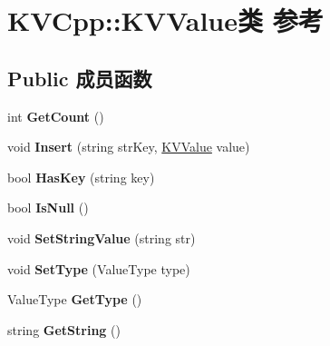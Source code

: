\hypertarget{class_k_v_cpp_1_1_k_v_value}{}\section{K\+V\+Cpp\+:\+:K\+V\+Value类 参考}
\label{class_k_v_cpp_1_1_k_v_value}
\subsection*{Public 成员函数}
\begin{DoxyCompactItemize}
\item 
\hypertarget{class_k_v_cpp_1_1_k_v_value_a1094ae0e25797cba3dcf28e4b39009a4}{}int {\bfseries Get\+Count} ()\label{class_k_v_cpp_1_1_k_v_value_a1094ae0e25797cba3dcf28e4b39009a4}

\item 
\hypertarget{class_k_v_cpp_1_1_k_v_value_a7e513ef26bca660c42dc024794b43326}{}void {\bfseries Insert} (string str\+Key, \hyperlink{class_k_v_cpp_1_1_k_v_value}{K\+V\+Value} value)\label{class_k_v_cpp_1_1_k_v_value_a7e513ef26bca660c42dc024794b43326}

\item 
\hypertarget{class_k_v_cpp_1_1_k_v_value_ab095eeb3c18c47e4d4cb6886c9d17a10}{}bool {\bfseries Has\+Key} (string key)\label{class_k_v_cpp_1_1_k_v_value_ab095eeb3c18c47e4d4cb6886c9d17a10}

\item 
\hypertarget{class_k_v_cpp_1_1_k_v_value_a5a41f49aef96183be3fc97f7451c2261}{}bool {\bfseries Is\+Null} ()\label{class_k_v_cpp_1_1_k_v_value_a5a41f49aef96183be3fc97f7451c2261}

\item 
\hypertarget{class_k_v_cpp_1_1_k_v_value_a68a409d67b00438059a98f58f5ab0472}{}void {\bfseries Set\+String\+Value} (string str)\label{class_k_v_cpp_1_1_k_v_value_a68a409d67b00438059a98f58f5ab0472}

\item 
\hypertarget{class_k_v_cpp_1_1_k_v_value_a27584f58766212a4455a69324fecf5c3}{}void {\bfseries Set\+Type} (Value\+Type type)\label{class_k_v_cpp_1_1_k_v_value_a27584f58766212a4455a69324fecf5c3}

\item 
\hypertarget{class_k_v_cpp_1_1_k_v_value_adf2482f4e5c89ae6e91bd81462e5311c}{}Value\+Type {\bfseries Get\+Type} ()\label{class_k_v_cpp_1_1_k_v_value_adf2482f4e5c89ae6e91bd81462e5311c}

\item 
\hypertarget{class_k_v_cpp_1_1_k_v_value_ae05d7a517cdc816bd008cfddf76a60fc}{}string {\bfseries Get\+String} ()\label{class_k_v_cpp_1_1_k_v_value_ae05d7a517cdc816bd008cfddf76a60fc}


\end{DoxyCompactItemize}

